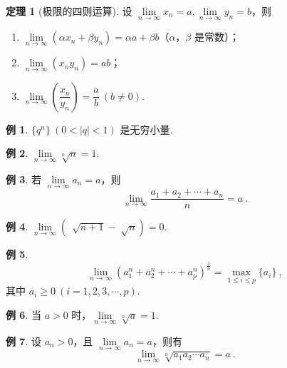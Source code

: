 \documentclass[zihao=-4,linespread=1.8,UTF8,nothm]{aytony_base}
\theoremstyle{definition}
\newtheorem{theorem}{\indent\heiti\textbf{定理}}[subsection]
\newtheorem{example}{\indent\heiti\textbf{例}}[subsection]
\begin{document}
\begin{theorem}[极限的四则运算]
    设 $\lim\limits_{n \to \infty} x_n = a, \lim\limits_{n \to \infty} y_n = b$，则

    \begin{enumerate}
        \item $\lim\limits_{n \to \infty} (\alpha x_n + \beta y_n) = \alpha a + \beta b$（$\alpha$，$\beta$ 是常数）；
        \item $\lim\limits_{n \to \infty} (x_ny_n) = ab$；
        \item $\lim\limits_{n \to \infty} (\dfrac{x_n}{y_n}) = \dfrac{a}{b}\ (b \neq 0)$.
    \end{enumerate}
\end{theorem}

\setcounter{example}{1}
\begin{example}
    $\{q^n\}\ (0 < |q| < 1)$ 是无穷小量.
\end{example}

\setcounter{example}{3}
\begin{example}
    $\lim\limits_{n \to \infty} \sqrt[n]{n} = 1$.
\end{example}

\setcounter{example}{5}
\begin{example}
    若 $\lim\limits_{n \to \infty} a_n = a$，则 $$
        \lim\limits_{n \to \infty} \dfrac{a_1 + a_2 + \cdots + a_n}{n} = a\ .
    $$
\end{example}

\begin{example}
    $\lim\limits_{n \to \infty} (\,\sqrt[]{n+1} - \sqrt[]{n}) = 0$.
\end{example}

\begin{example}
    $$\lim\limits_{n \to \infty} (a_1^n + a_2^n + \cdots + a_p^n)^{\frac{1}{n}} = \max\limits_{1 \leqslant i \leqslant p} \{a_i\}\ ,$$ 其中 $a_i \geqslant 0\ (i = 1, 2, 3, \cdots, p)$.
\end{example}

\setcounter{example}{9}
\begin{example}
    当 $a > 0$ 时，$\lim\limits_{n \to \infty} \sqrt[n]{a} = 1$.
\end{example}

\setcounter{example}{11}
\begin{example}
    设 $a_n > 0$，且 $\lim\limits_{n \to \infty} a_n = a$，则有 $$
        \lim\limits_{n \to \infty} \sqrt[n]{a_1a_2\cdots a_n} = a\ .
    $$
\end{example}
\end{document}
